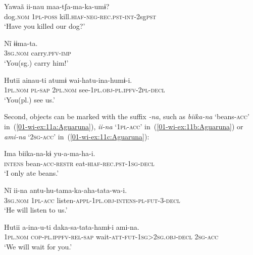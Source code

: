 \documentclass[output=paper]{LSP/langsci}
\begin{document}
\ea\label{01-wi-ex:10:Aguaruna}
\begin{xlist}

\ex\label{01-wi-ex:10a:Aguaruna}
	\gll Yawaã		ii-nau		maa-tʃa-ma-ka-umɨ?\\
	dog.\textsc{nom}	\textsc{1pl}-\textsc{poss}	kill.\textsc{hiaf}-\textsc{neg}-\textsc{rec.pst}-\textsc{int}-2sg\textsc{pst}\\
	\glt ‘Have you killed our dog?’ %

\ex\label{01-wi-ex:10b:Aguaruna}
	\gll Nĩ		ɨɨma-ta.\\
	\textsc{3sg.nom}	carry.\textsc{pfv}-\textsc{imp}\\
	\glt ‘You(sg.) carry him!’ %

\ex\label{01-wi-ex:10c:Aguaruna}
	\gll Hutii		ainau-ti	atumɨ		wai-hatu-ina-humɨ-i.\\
	\textsc{1pl.nom}	\textsc{pl}-\textsc{sap}	2\textsc{pl.nom}	see-\textsc{1pl.obj}-\textsc{pl.ipfv}-\textsc{2pl}-\textsc{decl}\\
	\glt ‘You(pl.) see us.’ %
\end{xlist}
\z

\noindent Second, objects can be marked with the  suffix \textit{-na}, such as \textit{biika-na} ‘beans-\textsc{acc}’ in~(\ref{01-wi-ex:11a:Aguaruna}), \textit{ii-na} ‘\textsc{1pl-acc}’ in~(\ref{01-wi-ex:11b:Aguaruna}) or \textit{ami-na} ‘\textsc{2sg-acc}’ in~(\ref{01-wi-ex:11c:Aguaruna}):

\ea\label{01-wi-ex:11:Aguaruna}
\begin{xlist}

\ex\label{01-wi-ex:11a:Aguaruna}
	\gll Ima		biika-na-kɨ		yu-a-ma-ha-i.\\
	\textsc{intens}	bean-\textsc{acc}-\textsc{restr}	eat-\textsc{hiaf}-\textsc{rec.pst}-\textsc{1sg}-\textsc{decl}\\
	\glt ‘I only ate beans.’ %

\ex\label{01-wi-ex:11b:Aguaruna}
	\gll Nĩ		ii-na		antu-hu-tama-ka-aha-tata-wa-i.\\
	\textsc{3sg.nom}	\textsc{1pl}-\textsc{acc}	listen-\textsc{appl}-\textsc{1pl.obj}-\textsc{intens}-\textsc{pl}-\textsc{fut}-\textsc{3}-\textsc{decl}\\
	\glt ‘He will listen to us.’ %

\ex\label{01-wi-ex:11c:Aguaruna}
	\gll Hutii		a-ina-u-ti			daka-sa-tata-hamɨ-i 	ami-na.\\
	\textsc{1pl.nom}	\textsc{cop}-\textsc{pl.ippfv}-\textsc{rel}-\textsc{sap}	wait-\textsc{att}-\textsc{fut}-\textsc{1sg}>\textsc{2sg.obj}-\textsc{decl} \textsc{2sg}-\textsc{acc}\\
	\glt ‘We will wait for you.’ %
\end{xlist}
\z
\end{document}
